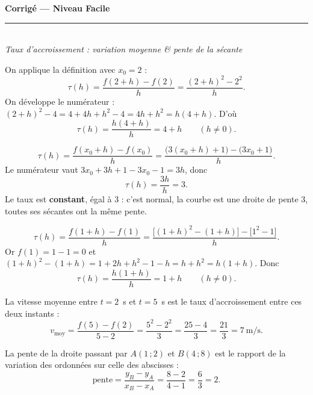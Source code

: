 \pagestyle{fancy}\fancyhf{}
\fancyfoot[C]{\small\thepage}
\renewcommand{\headrulewidth}{0.8pt}



\begin{center}
{\LARGE\bfseries\color{primarydark} Corrigé — Niveau Facile}\\[2pt]
{\color{primary}\rule{0.5\textwidth}{1.2pt}}\\[4pt]
{\small\itshape Taux d'accroissement : variation moyenne \& pente de la sécante}
\end{center}
\vspace{2mm}

\begin{corr}[1 --- $f(x)=x^2$ entre $x_0=2$ et $2+h$]
On applique la définition avec $x_0=2$ :
\[
\tau(h)=\frac{f(2+h)-f(2)}{h}=\frac{(2+h)^2-2^2}{h}.
\]
On développe le numérateur : $(2+h)^2-4=4+4h+h^2-4=4h+h^2=h(4+h)$. D'où
\[
\tau(h)=\frac{h(4+h)}{h}=\boxed{4+h}\qquad(h\neq 0).
\]
\end{corr}

\begin{corr}[2 --- $f(x)=3x+1$ en $x_0$ quelconque]
\[
\tau(h)=\frac{f(x_0+h)-f(x_0)}{h}
=\frac{\big(3(x_0+h)+1\big)-\big(3x_0+1\big)}{h}.
\]
Le numérateur vaut $3x_0+3h+1-3x_0-1=3h$, donc
\[
\tau(h)=\frac{3h}{h}=\boxed{3}.
\]
Le taux est \textbf{constant}, égal à $3$ : c'est normal, la courbe est une droite de
pente $3$, toutes ses sécantes ont la même pente.
\end{corr}

\begin{corr}[3 --- $f(x)=x^2-x$ entre $x_0=1$ et $1+h$]
\[
\tau(h)=\frac{f(1+h)-f(1)}{h}
=\frac{\big[(1+h)^2-(1+h)\big]-\big[1^2-1\big]}{h}.
\]
Or $f(1)=1-1=0$ et $(1+h)^2-(1+h)=1+2h+h^2-1-h=h+h^2=h(1+h)$. Donc
\[
\tau(h)=\frac{h(1+h)}{h}=\boxed{1+h}\qquad(h\neq 0).
\]
\end{corr}

\begin{corr}[4 --- vitesse moyenne, $y=f(x)=x^2$]
La vitesse moyenne entre $t=2$~s et $t=5$~s est le taux d'accroissement entre ces deux
instants :
\[
v_{\text{moy}}=\frac{f(5)-f(2)}{5-2}=\frac{5^2-2^2}{3}=\frac{25-4}{3}=\frac{21}{3}
=\boxed{7\ \text{m/s}}.
\]
\end{corr}

\begin{corr}
La pente de la droite passant par $A(1\,;2)$ et $B(4\,;8)$ est le rapport de la variation
des ordonnées sur celle des abscisses :
\[
\text{pente}=\frac{y_B-y_A}{x_B-x_A}=\frac{8-2}{4-1}=\frac{6}{3}=\boxed{2}.
\]
\end{corr}


